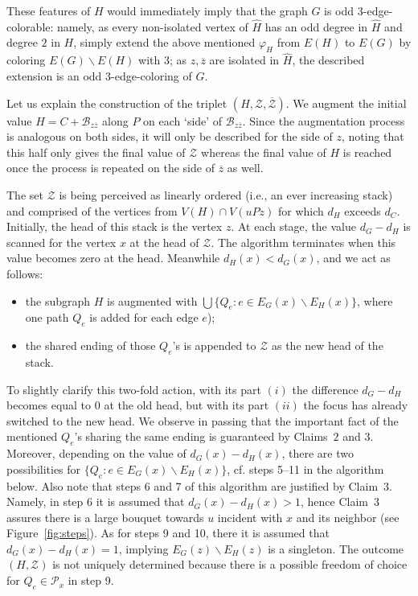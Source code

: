 \documentclass[a4paper,12pt]{article}
\numberwithin{equation}{section}
\begin{document}
These features of $H$ would immediately imply that the graph $G$ is odd $3$-edge-colorable: namely, as every non-isolated vertex of $\hat{H}$ has an odd degree in $\hat{H}$ and degree $2$ in $H$, simply extend the above mentioned $\varphi_H$ from $E(H)$ to $E(G)$ by coloring $E(G)\backslash E(H)$ with $3$; as $z,\overline{z}$ are isolated in $\hat{H}$, the described extension is an odd $3$-edge-coloring of $G$.

\smallskip

Let us explain the construction of the triplet $(H,\mathcal{Z},\overline{\mathcal{Z}})$. We augment the initial value $H=C+\mathcal{B}_{z\overline{z}}$ along $P$ on each `side' of $\mathcal{B}_{z\overline{z}}$. Since the augmentation process is analogous on both sides, it will only be described for the side of $z$, noting that this half only gives the final value of $\mathcal{Z}$ whereas the final value of $H$ is reached once the process is repeated on the side of $\overline{z}$ as well.



The set $\mathcal{Z}$ is being perceived as linearly ordered (i.e., an ever increasing stack) and comprised of the vertices from $V(H)\cap V(uPz)$ for which $d_H$ exceeds $d_C$. Initially, the head of this stack is the vertex $z$. At each stage, the value $d_G-d_H$ is scanned for the vertex $x$ at the head of $\mathcal{Z}$. The algorithm terminates when this value becomes zero at the head. Meanwhile $d_H(x)<d_G(x)$, and we act as follows:
\begin{itemize}
\item[$(i)$] the subgraph $H$ is augmented with $\bigcup\{Q_e: e\in E_G(x)\backslash E_H(x)\}$, where one path $Q_e$ is added for each edge $e$);
\item[$(ii)$] the shared ending of those $Q_e$'s is appended to $\mathcal{Z}$ as the new head of the stack.
\end{itemize}
\noindent To slightly clarify this two-fold action, with its part $(i)$ the difference $d_G-d_H$ becomes equal to $0$ at the old head, but with its part $(ii)$ the focus has already switched to the new head. We observe in passing that the important fact of the mentioned $Q_e$'s sharing the same ending is guaranteed by Claims~$2$ and $3$. Moreover, depending on the value of $d_G(x)-d_H(x)$, there are two possibilities for $\{Q_e: e\in E_G(x)\backslash E_H(x)\}$, cf. steps 5--11 in the algorithm below. Also note that steps 6 and 7 of this algorithm are justified by Claim~$3$. Namely, in step 6 it is assumed that $d_G(x)-d_H(x)>1$, hence Claim~$3$ assures there is a large bouquet towards $u$ incident with $x$ and its neighbor (see Figure~\ref{fig:steps}). As for steps 9 and 10, there it is assumed that $d_G(x)-d_H(x)=1$, implying $E_G(z)\backslash E_H(z)$ is a singleton. The outcome $(H,\mathcal{Z})$ is not uniquely determined because there is a possible freedom of choice for $Q_e\in\mathcal{P}_x$ in step 9.
\end{document}
